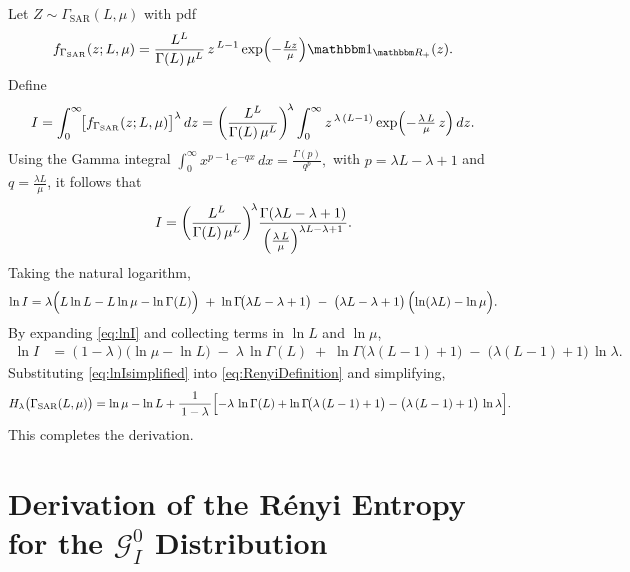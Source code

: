 \documentclass[11pt,]{article}
\begin{document}
Let \(Z \sim \Gamma_{\text{SAR}}(L, \mu)\) with pdf \begin{align*}
f_{\Gamma_{\text{SAR}}}(z; L, \mu)
&= \frac{L^L}{\Gamma(L)\,\mu^L}\,z^{\,L - 1} 
  \exp\Bigl(-\tfrac{L z}{\mu}\Bigr)\mathbbm 1_{\mathbbm R_+}(z).
\end{align*} Define \begin{align*}
I 
&= \int_{0}^{\infty}\!\bigl[f_{\Gamma_{\text{SAR}}}(z; L,\mu)\bigr]^\lambda \,dz 
 = \biggl(\frac{L^L}{\Gamma(L)\,\mu^L}\biggr)^{\!\lambda}
   \int_{0}^{\infty} 
   z^{\,\lambda\,(L-1)} \exp\Bigl(-\tfrac{\lambda\,L}{\mu}\,z\Bigr)\,dz.
\end{align*} Using the Gamma integral \(\displaystyle
  \int_{0}^{\infty} x^{p-1} e^{-qx}\,dx
   = \frac{\Gamma(p)}{q^p},\) with \(p = \lambda L - \lambda + 1\) and
\(q = \tfrac{\lambda L}{\mu}\), it follows that \begin{align*}
I 
&= \biggl(\frac{L^L}{\Gamma(L)\,\mu^L}\biggr)^{\!\lambda}
   \frac{\Gamma(\lambda L - \lambda + 1)}
        {\Bigl(\tfrac{\lambda\,L}{\mu}\Bigr)^{\lambda L - \lambda + 1}}.
\end{align*} Taking the natural logarithm, \begin{align}
\ln I 
&= \lambda\Bigl(L \ln L - L \ln \mu - \ln \Gamma(L)\Bigr)
   \;+\; \ln\Gamma\!\bigl(\lambda L - \lambda + 1\bigr)
   \;-\; \bigl(\lambda L - \lambda + 1\bigr)\,\Bigl(\ln(\lambda L) - \ln\mu\Bigr).
\label{eq:lnI}
\end{align} By expanding \eqref{eq:lnI} and collecting terms in
\(\ln L\) and \(\ln \mu\), \begin{align}
\ln I 
&= (1 - \lambda)\bigl(\ln \mu - \ln L\bigr)
   \;-\;\lambda\,\ln \Gamma(L)
   \;+\;\ln\Gamma\!\bigl(\lambda(L-1)+1\bigr)
   \;-\;\bigl(\lambda(L-1)+1\bigr)\,\ln \lambda.
\label{eq:lnIsimplified}
\end{align} Substituting \eqref{eq:lnIsimplified} into
\eqref{eq:RenyiDefinition} and simplifying, \begin{multline}
H_\lambda\bigl(\Gamma_{\text{SAR}}(L,\mu)\bigr) 
= \ln \mu - \ln L 
  + \frac{1}{\,1-\lambda\,}
  \Bigl[
    -\lambda\,\ln\Gamma(L)
    + \ln\Gamma\!\bigl(\lambda\,(L-1)+1\bigr)
    - \bigl(\lambda\,(L-1)+1\bigr)\,\ln\lambda
  \Bigr].
\label{eq:RenyiFinal}
\end{multline} This completes the derivation.

\section{\texorpdfstring{Derivation of the Rényi Entropy for the
\texorpdfstring{$\mathcal{G}^0_I$}{G0I}
Distribution}{Derivation of the Rényi Entropy for the  Distribution}}\label{derivation-of-the-ruxe9nyi-entropy-for-the-distribution}
\end{document}
